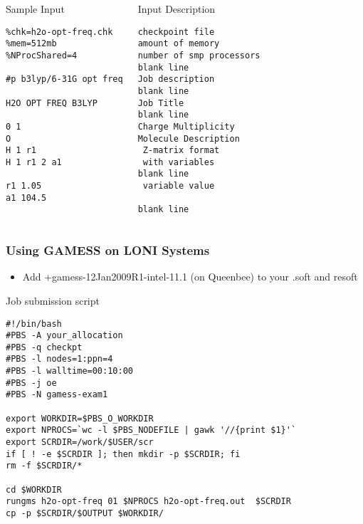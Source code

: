 \documentclass[slidestop,mathserif,compress,xcolor=svgnames]{beamer}
\begin{document}
\begin{frame}[fragile]
\footnotesize{
\begin{columns}
\column{6.5cm}
\begin{block}{Sample Input}
\begin{verbatim}
%chk=h2o-opt-freq.chk
%mem=512mb
%NProcShared=4

#p b3lyp/6-31G opt freq

H2O OPT FREQ B3LYP

0 1
O
H 1 r1
H 1 r1 2 a1

r1 1.05 
a1 104.5

\end{verbatim}
\end{block}
\column{5cm}
{\color{tigersblue}
\begin{alertblock}{Input Description}
\begin{verbatim}
checkpoint file
amount of memory
number of smp processors
blank line
Job description
blank line
Job Title
blank line
Charge Multiplicity
Molecule Description
 Z-matrix format 
 with variables
blank line
 variable value

blank line
\end{verbatim}
\end{alertblock}
}
\end{columns}
}
\end{frame}

\begin{frame}[fragile]
\frametitle{\small Using GAMESS on LONI Systems}
\begin{itemize}
\item Add +gamess-12Jan2009R1-intel-11.1 (on Queenbee) to your .soft and resoft
\end{itemize}
{\tiny
\begin{exampleblock}{Job submission script}
{\color{white}
\begin{verbatim}
#!/bin/bash
#PBS -A your_allocation
#PBS -q checkpt
#PBS -l nodes=1:ppn=4
#PBS -l walltime=00:10:00
#PBS -j oe
#PBS -N gamess-exam1

export WORKDIR=$PBS_O_WORKDIR
export NPROCS=`wc -l $PBS_NODEFILE | gawk '//{print $1}'`
export SCRDIR=/work/$USER/scr
if [ ! -e $SCRDIR ]; then mkdir -p $SCRDIR; fi
rm -f $SCRDIR/*

cd $WORKDIR
rungms h2o-opt-freq 01 $NPROCS h2o-opt-freq.out  $SCRDIR
cp -p $SCRDIR/$OUTPUT $WORKDIR/
\end{verbatim}
}
\end{exampleblock}
}
\end{frame}
\end{document}
